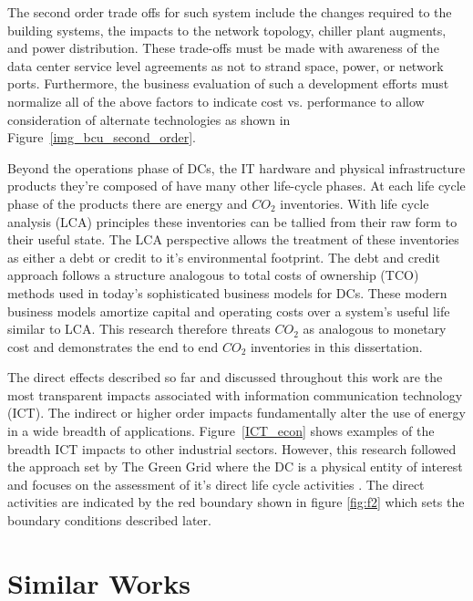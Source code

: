     The second order trade offs for such system include the changes required to the building systems, the impacts to the network topology, chiller plant augments, and power distribution. These trade-offs must be made with awareness of the data center service level agreements as not to strand space, power, or network ports. Furthermore, the business evaluation of such a development efforts must normalize all of the above factors to indicate cost vs. performance to allow consideration of alternate technologies as shown in Figure~\ref{img_bcu_second_order}.
    
    
    
    Beyond the operations phase of DCs, the IT hardware and physical infrastructure products they're composed of have many other life-cycle phases. At each life cycle phase of the products there are energy and $CO_2$ inventories. With life cycle analysis (LCA) principles these inventories can be tallied from their raw form to their useful state.  The LCA perspective allows the treatment of these inventories as either a debt or credit to it's environmental footprint. The debt and credit approach follows a structure analogous to total costs of ownership (TCO) methods used in today's sophisticated business models for DCs. These modern business models amortize capital and operating costs over a system's useful life similar to LCA. This research therefore threats $CO_2$ as analogous to monetary cost and demonstrates the end to end $CO_2$ inventories in this dissertation.
    
    The direct effects described so far and discussed throughout this work are the most transparent impacts associated with information communication technology (ICT). The indirect or higher order impacts fundamentally alter the use of energy in a wide breadth of applications. Figure~\ref{ICT_econ} shows examples of the breadth ICT impacts to other industrial sectors. However, this research followed the approach set by The Green Grid where the DC is a physical entity of interest and focuses on the assessment of it's direct life cycle activities \cite{tgg12}. The direct activities are indicated by the red boundary shown in figure  \ref{fig:f2} which sets the boundary conditions described later. 
    
    
    
\section{Similar Works}
    
